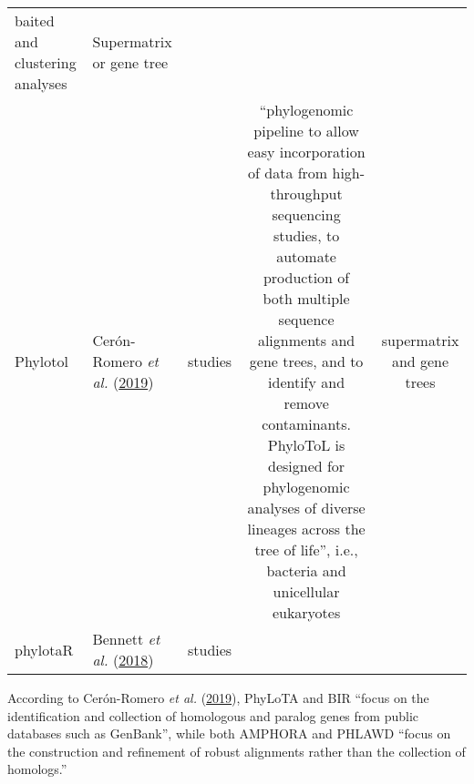 \documentclass[]{article}
\begin{document}
\begin{longtable}[]{@{}llccc@{}}
\begin{minipage}[t]{0.20\columnwidth}
baited and clustering analyses\strut
\end{minipage} & \begin{minipage}[t]{0.20\columnwidth}\centering
Supermatrix or gene tree\strut
\end{minipage}\tabularnewline
\begin{minipage}[t]{0.12\columnwidth}\raggedright
Phylotol\strut
\end{minipage} & \begin{minipage}[t]{0.15\columnwidth}\raggedright
Cerón-Romero \emph{et al.} (\protect\hyperlink{ref-ceron2019phylotol}{2019})\strut
\end{minipage} & \begin{minipage}[t]{0.20\columnwidth}\centering
5 studies\strut
\end{minipage} & \begin{minipage}[t]{0.20\columnwidth}\centering
``phylogenomic pipeline to allow easy incorporation of data from high-throughput sequencing studies, to automate production of both multiple sequence alignments and gene trees, and to identify and remove contaminants. PhyloToL is designed for phylogenomic analyses of diverse lineages across the tree of life'', i.e., bacteria and unicellular eukaryotes\strut
\end{minipage} & \begin{minipage}[t]{0.20\columnwidth}\centering
supermatrix and gene trees\strut
\end{minipage}\tabularnewline
\begin{minipage}[t]{0.12\columnwidth}\raggedright
phylotaR\strut
\end{minipage} & \begin{minipage}[t]{0.15\columnwidth}\raggedright
Bennett \emph{et al.} (\protect\hyperlink{ref-bennett2018phylotar}{2018})\strut
\end{minipage} & \begin{minipage}[t]{0.20\columnwidth}\centering
studies\strut
\end{minipage} & \begin{minipage}[t]{0.20\columnwidth}\centering
\strut
\end{minipage} & \begin{minipage}[t]{0.20\columnwidth}\centering
\strut
\end{minipage}\tabularnewline
\bottomrule
\end{longtable}

According to Cerón-Romero \emph{et al.} (\protect\hyperlink{ref-ceron2019phylotol}{2019}), PhyLoTA and BIR ``focus on the identification and collection
of homologous and paralog genes from public databases such as GenBank'', while both AMPHORA and PHLAWD
``focus on the construction and refinement of robust alignments rather than the collection of homologs.''
\end{document}
